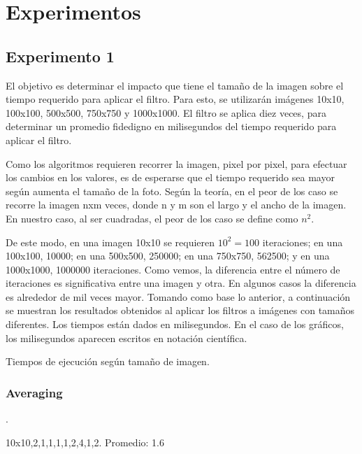 \documentclass[conference]{IEEEtran}
\begin{document}
\section{Experimentos}
\subsection{Experimento 1}
El objetivo es determinar el impacto que tiene el tamaño de la imagen
sobre el tiempo requerido para aplicar el filtro. Para esto, se utilizarán
imágenes 10x10, 100x100, 500x500, 750x750 y 1000x1000. El filtro se aplica diez veces,
para determinar un promedio fidedigno en milisegundos del tiempo requerido para aplicar
el filtro. \newline

Como los algoritmos requieren recorrer la imagen, pixel por pixel, para efectuar los cambios
en los valores, es de esperarse que el tiempo requerido sea mayor según aumenta el tamaño de
la foto. Según la teoría, en el peor de los caso se recorre la imagen nxm veces, donde n y m son
el largo y el ancho de la imagen. En nuestro caso, al ser cuadradas, el peor de los caso se define
como $n^2$.\newline

De este modo, en una imagen 10x10 se requieren $10^2=100$ iteraciones; en una 100x100, 10000; en una 500x500, 250000; en una 750x750, 562500; y en una 1000x1000, 1000000 iteraciones. Como vemos, la diferencia entre el número de iteraciones es significativa entre una imagen y otra. En algunos casos la diferencia es alrededor de mil veces mayor.\newline
Tomando como base lo anterior, a continuación se muestran los resultados obtenidos al aplicar
los filtros a imágenes con tamaños diferentes. Los tiempos están dados en milisegundos. En el caso de los gráficos, los milisegundos aparecen escritos en notación científica.\newline


Tiempos de ejecución según tamaño de imagen.

\subsubsection{Averaging}

.
\newline

10x10,2,1,1,1,1,2,4,1,2.\newline
Promedio: 1.6
\newline
\end{document}
